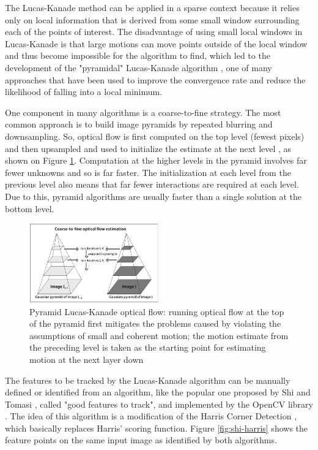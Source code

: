 \documentclass[msc, a4paper, classic, en]{ufbathesis}
\begin{document}
The Lucas-Kanade method can be applied in a sparse context because it relies only on local information that is derived from some small window surrounding each of the points of interest. The disadvantage of using small local windows in Lucas-Kanade is that large motions can move points outside of the local window and thus become impossible for the algorithm to find, which led to the development of the "pyramidal" Lucas-Kanade algorithm \cite{Bouguet00}, one of many approaches that have been used to improve the convergence rate and reduce the likelihood of falling into a local minimum.

One component in many algorithms is a coarse-to-fine strategy. The most common approach is to build image pyramids by repeated blurring and downsampling. So, optical flow is first computed on the top level (fewest pixels) and then upsampled and used to initialize the estimate at the next level \cite{dblk}, as shown on Figure \ref{fig:plk}. Computation at the higher levels in the pyramid involves far fewer unknowns and so is far faster. The initialization at each level from the previous level also means that far fewer interactions are required at each level. Due to this, pyramid algorithms are usually faster than a single solution at the bottom level.

\begin{figure}
\centering
\includegraphics[width=0.5\textwidth]{images/plk.png}
\caption{Pyramid Lucas-Kanade optical flow: running optical flow at the top of the pyramid first
\label{fig:plk}
mitigates the problems caused by violating the assumptions of small and coherent motion; the motion estimate from the preceding level is taken as the starting point for estimating motion at the next layer down \cite{bradski2008learning}}
\end{figure}

The features to be tracked by the Lucas-Kanade algorithm can be manually defined or identified from an algorithm, like the popular one proposed by Shi and Tomasi \cite{shi}, called "good features to track", and implemented by the OpenCV library \cite{opencv}. The idea of this algorithm is a modification of the Harris Corner Detection \cite{harris}, which basically replaces Harris' scoring function. Figure \ref{fig:shi-harris} shows the feature points on the same input image as identified by both algorithms.
\end{document}
